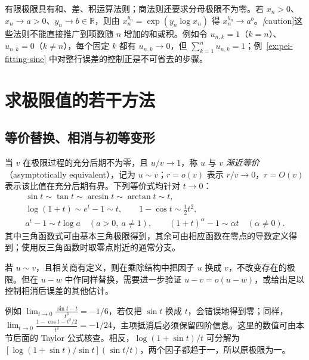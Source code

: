 有限极限具有和、差、积运算法则；商法则还要求分母极限不为零。若 $x_n>0$、$x_n\to a>0$、$y_n\to b\in\mathbb{R}$，则由 $x_n^{y_n}=\exp(y_n\log x_n)$ 得 $x_n^{y_n}\to a^b$。\emph[caution]{这些法则不能直接推广到项数随 $n$ 增加的和或积。}例如令 $u_{n,k}=1$（$k=n$）、$u_{n,k}=0$（$k\ne n$），每个固定 $k$ 都有 $u_{n,k}\to0$，但 $\sum_{k=1}^nu_{n,k}=1$；例~\ref{ex:pei-fitting-sine} 中对整行误差的控制正是不可省去的步骤。

\section{求极限值的若干方法}
\label{sec:pei-computing-limits}

\subsection{等价替换、相消与初等变形}

当 $v$ 在极限过程的充分后期不为零，且 $u/v\to1$，称 $u$ 与 $v$ \emph{渐近等价}（asymptotically equivalent），记为 $u\sim v$；$r=o(v)$ 表示 $r/v\to0$，$r=O(v)$ 表示该比值在充分后期有界。下列等价式均针对 $t\to0$：
\begin{equation}
    \begin{gathered}
        \sin t\sim\tan t\sim\arcsin t\sim\arctan t\sim t,\\
        \log(1+t)\sim e^t-1\sim t,\qquad
        1-\cos t\sim\tfrac12t^2,\\
        a^t-1\sim t\log a\quad(a>0,\ a\ne1),\qquad
        (1+t)^\alpha-1\sim\alpha t\quad(\alpha\ne0).
    \end{gathered}
    \label{eq:pei-equivalents}
\end{equation}
其中三角函数式可由基本三角极限得到，其余可由相应函数在零点的导数定义得到；使用反三角函数时取零点附近的通常分支。

\begin{proposition}[等价替换的范围]
\label{prop:pei-equivalent-replacement}
若 $u\sim v$，且相关商有定义，则在乘除结构中把因子 $u$ 换成 $v$，不改变存在的极限。但在 $u-w$ 中作同样替换，需要进一步验证 $u-v=o(u-w)$，或给出足以控制相消后误差的其他估计。
\end{proposition}

例如 $\displaystyle\lim_{t\to0}\frac{\sin t-t}{t^3}=-1/6$，若仅把 $\sin t$ 换成 $t$，会错误地得到零；同样，$\displaystyle\lim_{t\to0}\frac{1-\cos t-t^2/2}{t^4}=-1/24$，主项抵消后必须保留四阶信息。这里的数值可由本节后面的 Taylor 公式核查。相反，$\log(1+\sin t)/t$ 可分解为 $[\log(1+\sin t)/\sin t](\sin t/t)$，两个因子都趋于一，所以原极限为一。

